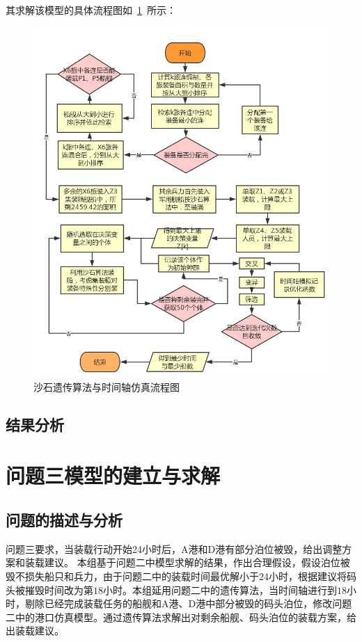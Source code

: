 \documentclass{whutmod}
\begin{document}
    	 
    	 其求解该模型的具体流程图如~\ref{dierwen}~所示：
    \begin{figure}[H]
    	\centering
    	\includegraphics[width=\textwidth]{figures/dierwen.png}
    	\caption{沙石遗传算法与时间轴仿真流程图}\label{dierwen}
    \end{figure}
     
     	\subsection{结果分析}
     \section{问题三模型的建立与求解}
   	\subsection{问题的描述与分析}
   	问题三要求，当装载行动开始24小时后，A港和D港有部分泊位被毁，给出调整方案和装载建议。
   	本组基于问题二中模型求解的结果，作出合理假设，假设泊位被毁不损失船只和兵力，由于问题二中的装载时间最优解小于$24$小时，根据建议将码头被摧毁时间改为第$18$小时。本组延用问题二中的遗传算法，当时间轴进行到$18$小时，剔除已经完成装载任务的船舰和A港、D港中部分被毁的码头泊位，修改问题二中的港口仿真模型。通过遗传算法求解出对剩余船舰、码头泊位的装载方案，给出装载建议。
\end{document}
